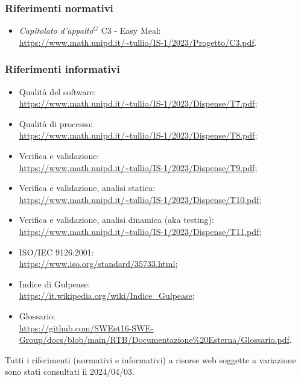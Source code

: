 \subsubsection{Riferimenti normativi}

\begin{itemize}
\item \emph{Capitolato d’appalto}$^{G}$ C3 - Easy Meal: \\ \url{https://www.math.unipd.it/~tullio/IS-1/2023/Progetto/C3.pdf}.
\end{itemize}
\subsubsection{Riferimenti informativi}

\begin{itemize}
\item Qualità del software: \\ \url{https://www.math.unipd.it/~tullio/IS-1/2023/Dispense/T7.pdf};
\item Qualità di processo:\\ \url{https://www.math.unipd.it/~tullio/IS-1/2023/Dispense/T8.pdf};
\item Verifica e validazione: \\ \url{https://www.math.unipd.it/~tullio/IS-1/2023/Dispense/T9.pdf};
\item Verifica e validazione, analisi statica:\\ \url{https://www.math.unipd.it/~tullio/IS-1/2023/Dispense/T10.pdf};
\item Verifica e validazione, analisi dinamica (aka testing): \\ \url{https://www.math.unipd.it/~tullio/IS-1/2023/Dispense/T11.pdf};
\item ISO/IEC 9126:2001: \\ \url{https://www.iso.org/standard/35733.html};
\item Indice di Gulpease: \\ \url{https://it.wikipedia.org/wiki/Indice_Gulpease};
\item Glossario: \\ \url{https://github.com/SWEet16-SWE-Group/docs/blob/main/RTB/Documentazione%20Esterna/Glossario.pdf}.
\end{itemize}

Tutti i riferimenti (normativi e informativi) a risorse web soggette a variazione sono stati consultati il 2024/04/03.

